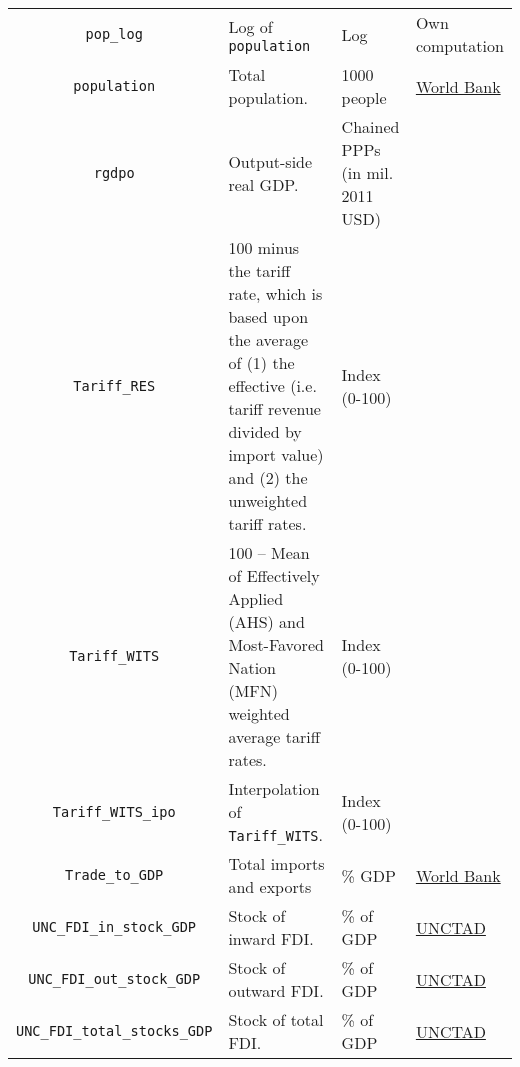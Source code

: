 \documentclass[
	a4paper,
	11pt,
	bibtotoc,
	headings=standardclasses,
  	headings=big]{scrartcl}
\newcommand{\code}[1]{\colorbox{gray!20}{\texttt{#1}}}
\begin{document}
\begin{longtable}{cL{5cm}L{2cm}L{2.75cm}}
\code{pop\_log} & Log of \code{population} & Log & Own computation \\
\code{population} & Total population. & 1000 people & \href{https://data.worldbank.org/indicator/SP.POP.TOTL}{World Bank}\\
\code{rgdpo} & Output-side real GDP. & Chained PPPs (in mil. 2011 USD) & \citet{Feenstra.2015} \\
\code{Tariff\_RES} & 100 minus the tariff rate, which is based upon the average of (1) the effective (i.e. tariff revenue divided by import value) and (2) the unweighted tariff rates. & Index (0-100) & \citet{Jaumotte.2013}\\
\code{Tariff\_WITS} & 100 – Mean of Effectively Applied (AHS) and Most-Favored Nation (MFN) weighted average tariff rates. & Index (0-100) & \citet{openness}\\
\code{Tariff\_WITS\_ipo} & Interpolation of \code{Tariff\_WITS}. & Index (0-100) & \citet{openness}\\
\code{Trade\_to\_GDP} & Total imports and exports & \% GDP & \href{https://data.worldbank.org/indicator/NE.TRD.GNFS.ZS}{World Bank}\\
\code{UNC\_FDI\_in\_stock\_GDP} & Stock of inward FDI. & \% of GDP & \href{https://unctadstat.unctad.org/EN/}{UNCTAD}\\
\code{UNC\_FDI\_out\_stock\_GDP} & Stock of outward FDI. & \% of GDP & \href{https://unctadstat.unctad.org/EN/}{UNCTAD}\\
\code{UNC\_FDI\_total\_stocks\_GDP} & Stock of total FDI. & \% of GDP & \href{https://unctadstat.unctad.org/EN/}{UNCTAD}\\
\bottomrule
\end{longtable}



\end{document}
